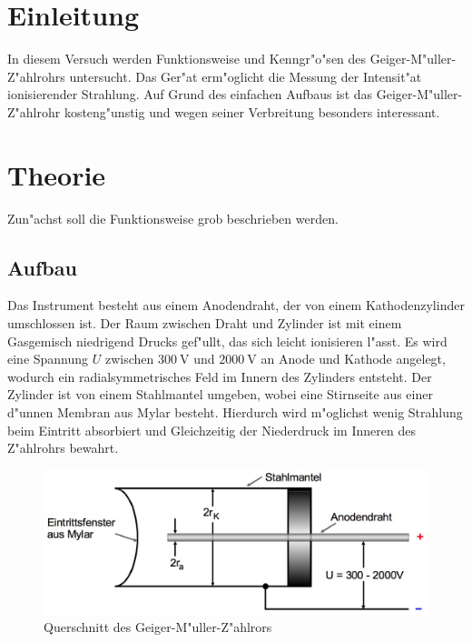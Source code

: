 \section{Einleitung} %
\label{sec:einleitung}
	In diesem Versuch werden Funktionsweise und Kenngr"o"sen des Geiger-M"uller-Z"ahlrohrs untersucht.
	Das Ger"at erm"oglicht die Messung der Intensit"at ionisierender Strahlung.
	Auf Grund des einfachen Aufbaus ist das Geiger-M"uller-Z"ahlrohr kosteng"unstig und wegen seiner Verbreitung besonders interessant.

\section{Theorie} %
\label{sec:theorie}
	Zun"achst soll die Funktionsweise grob beschrieben werden.

	\subsection{Aufbau}
	\label{subsec:aufbau}
		Das Instrument besteht aus einem Anodendraht, der von einem Kathodenzylinder umschlossen ist.
		Der Raum zwischen Draht und Zylinder ist mit einem Gasgemisch niedrigend Drucks gef"ullt, das sich leicht ionisieren l"asst.
		Es wird eine Spannung $U$ zwischen $\SI{300}{\volt}$ und $\SI{2000}{\volt}$ an Anode und Kathode angelegt, wodurch ein radialsymmetrisches Feld im Innern des Zylinders entsteht.
		Der Zylinder ist von einem Stahlmantel umgeben, wobei eine Stirnseite aus einer d"unnen Membran aus Mylar besteht.
		Hierdurch wird m"oglichst wenig Strahlung beim Eintritt absorbiert und Gleichzeitig der Niederdruck im Inneren des Z"ahlrohrs bewahrt.

		\begin{figure}[h]
			\centering
			\includegraphics[width = 15cm]{img/zaehlrohr.jpeg}
			\caption{Querschnitt des Geiger-M"uller-Z"ahlrors}
			\label{fig:querschnitt}
		\end{figure}

